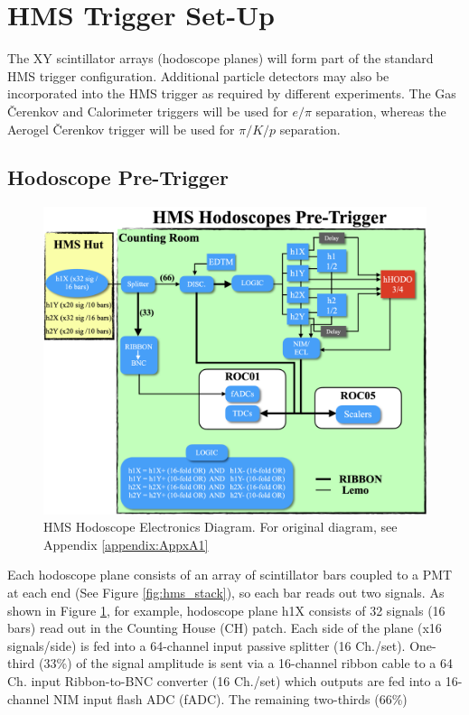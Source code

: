 \documentclass[11pt]{article}
\begin{document}
\newpage
\section{HMS Trigger Set-Up} 
\indent The XY scintillator arrays (hodoscope planes) will form part of the standard HMS trigger configuration.  
Additional particle detectors may also be incorporated into the HMS trigger as required by different experiments. The Gas \v{C}erenkov and Calorimeter triggers will be
used for $e/\pi$ separation, whereas the Aerogel \v{C}erenkov trigger will be used for $\pi/K/p$ separation. 


\subsection{Hodoscope Pre-Trigger}
\begin{figure}[h!]
  \centering
  \includegraphics[scale=0.35]{./hHODO_diagram.png}
  \caption{HMS Hodoscope Electronics Diagram. For original diagram, see Appendix \ref{appendix:AppxA1}}
  \label{fig:hHODO_diagram}
\end{figure}
\noindent Each hodoscope plane consists of an array of scintillator bars coupled to a PMT at each end (See Figure \ref{fig:hms_stack}), so each bar reads out two signals. As shown in Figure \ref{fig:hHODO_diagram},
for example, hodoscope plane h1X consists of 32 signals (16 bars) read out in the Counting House (CH) patch. Each side of the plane (x16 signals/side) is fed into a 64-channel input passive splitter (16 Ch./set).
One-third (33\%) of the signal amplitude is sent via a 16-channel ribbon cable to a 64 Ch. input Ribbon-to-BNC converter (16 Ch./set) which outputs are fed into a 16-channel NIM input flash ADC (fADC). The remaining two-thirds (66\%)
\end{document}
